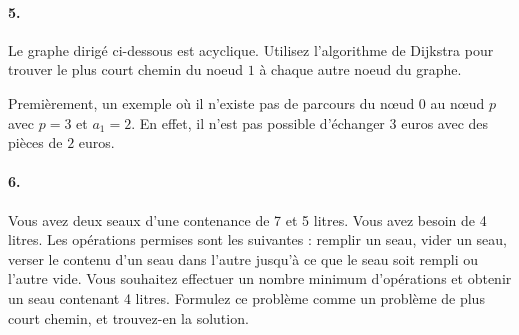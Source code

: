 \paragraph{5. } Le graphe dirigé ci-dessous est acyclique. Utilisez l'algorithme de Dijkstra pour trouver le plus court chemin du noeud $1$ à chaque autre noeud du graphe.
\begin{solution}
\begin{center}
\end{center}

	Premièrement, un exemple où il n'existe pas de parcours du nœud $0$ au nœud $p$ avec $p=3$ et $a_1 = 2$. En effet, il n'est pas possible d'échanger $3$ euros avec des pièces de $2$ euros.\\

\paragraph{6. } Vous avez deux seaux d'une contenance de 7 et 5 litres. Vous avez besoin de 4 litres. Les opérations permises sont les suivantes : remplir un seau, vider un seau, verser le contenu d'un seau dans l'autre jusqu'à ce que le seau soit rempli ou l'autre vide. Vous souhaitez effectuer un nombre minimum d'opérations et obtenir un seau contenant 4 litres. Formulez ce problème comme un problème de plus court chemin, et trouvez-en la solution.


\end{solution}
